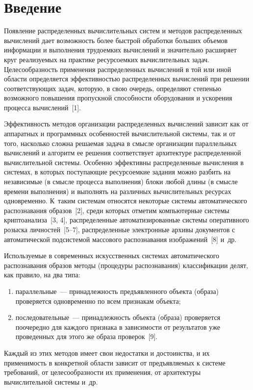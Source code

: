 \begin{multicols}{2}

\label{st\stat}

\section{Введение}

Появление распределенных вычислительных систем и методов распределенных
вычислений дает возможность более быстрой обработки больших объемов
информации и выполнения трудоемких вычислений и значительно расширяет
круг реализуемых на практике ресурсоемких вычислительных задач.
Целесообразность применения распределенных вычислений в той или иной
области определяется эффективностью распределенных вычислений при
решении соответствующих задач, которую, в свою очередь, определяют
степенью возможного повышения пропускной способности оборудования и
ускорения процесса вычислений~[1].

Эффективность методов организации распределенных вычислений зависит как
от аппаратных и программных особенностей вычислительной сис\-те\-мы, так и от
того, насколько сложна решаемая задача в смысле организации параллельных
вы\-чис\-ле\-ний и алгоритм ее решения соответствует архитектуре распределенной
вычислительной системы. Особенно эффективны распределенные вычисления
в системах, в которых поступающие ресурсоемкие задания можно разбить на
независимые (в смысле процесса выполнения) блоки любой длины (в смыс\-ле
времени выполнения) и выполнять на различных вычислительных ресурсах
одновременно. К~таким сис\-те\-мам относятся некоторые сис\-те\-мы
автоматического распознавания образов~[2], среди которых отметим
компьютерные сис\-те\-мы криптоанализа~[3, 4], распределенные
автоматизированные сис\-те\-мы оперативного розыска личностей~[5--7],
распределенные электронные архивы документов с автоматической
подсистемой массового распознавания изображений~[8] и~др.

Используемые в современных искусственных системах автоматического
распознавания образов методы (процедуры распознавания) классификации
делят, как правило, на два типа:
\begin{enumerate}[(1)]
\item параллельные~--- принадлежность
предъявленного объекта (образа) проверяется одновременно по всем признакам
объекта;
\item последовательные~--- принадлежность объекта (образа) проверяется
поочередно для каждого признака в зависимости от результатов уже
проведенных для этого же образа проверок~[9].
\end{enumerate}
Каждый из этих методов имеет
свои недостатки и достоинства, и их применимость в конкретной области
зависит от предъявляемых к системе требований, от целесообразности их
применения, от архитектуры вычислительной системы и~др.


\end{multicols}
